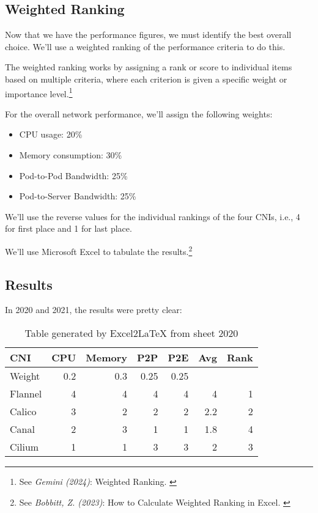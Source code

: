 \subsection{Weighted Ranking}

Now that we have the performance figures, we must identify the best overall choice. We'll use a weighted ranking of the performance criteria to do this.

The weighted ranking works by assigning a rank or score to individual items based on multiple criteria, where each criterion is given a specific weight or importance level.\footnote{See \textit{Gemini (2024)}: Weighted Ranking. \cite{bardWeigthed}}

For the overall network performance, we'll assign the following weights:

\begin{itemize}
    \item CPU usage: 20\%
    \item Memory consumption: 30\%
    \item Pod-to-Pod Bandwidth: 25\%
    \item Pod-to-Server Bandwidth: 25\%
\end{itemize}

We'll use the reverse values for the individual rankings of the four CNIs, i.e., 4 for first place and 1 for last place.

We'll use Microsoft Excel to tabulate the results.\footnote{See \textit{Bobbitt, Z. (2023)}: How to Calculate Weighted Ranking in Excel. \cite{howtoWeigh}}

\subsection{Results}

In 2020 and 2021, the results were pretty clear:

\begin{table}[H]
  \caption{Table generated by Excel2LaTeX from sheet 2020}
    \begin{tabular}{|l | r | r | r | r| r | r |}
    \hline
    CNI   & CPU & Memory & P2P & P2E & Avg & Rank \\
    \hline\hline
    Weight & 0.2   & 0.3   & 0.25  & 0.25  &       &  \\
    \hline
    Flannel & 4     & 4     & 4     & 4     & 4     & 1 \\
    \hline
    Calico & 3     & 2     & 2     & 2     & 2.2   & 2 \\
    \hline
    Canal & 2     & 3     & 1     & 1     & 1.8   & 4 \\
    \hline
    Cilium & 1     & 1     & 3     & 3     & 2     & 3 \\
    \hline
    \end{tabular}%
  \label{tab:e2l-2020}%
\end{table}%

